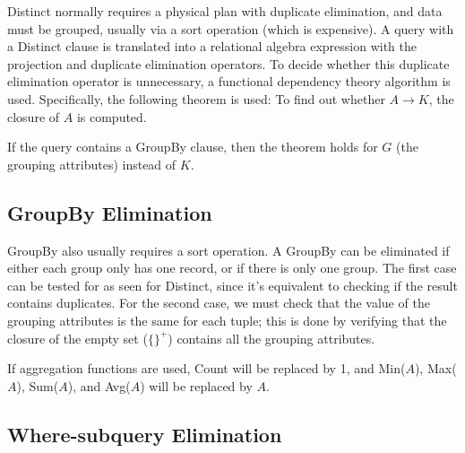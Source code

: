 Distinct normally requires a physical plan with duplicate elimination, and data must be grouped, usually via a sort operation (which is expensive). A query with a Distinct clause is translated into a relational algebra expression with the projection and duplicate elimination operators. To decide whether this duplicate elimination operator is unnecessary, a functional dependency theory algorithm is used. Specifically, the following theorem is used:
To find out whether $A \rightarrow K$, the closure of $A$ is computed.

If the query contains a GroupBy clause, then the theorem holds for $G$ (the grouping attributes) instead of $K$.

\subsection{GroupBy Elimination}

GroupBy also usually requires a sort operation. A GroupBy can be eliminated if either each group only has one record, or if there is only one group. The first case can be tested for as seen for Distinct, since it's equivalent to checking if the result contains duplicates. For the second case, we must check that the value of the grouping attributes is the same for each tuple; this is done by verifying that the closure of the empty set ($\{\}^+$) contains all the grouping attributes. 

If aggregation functions are used, Count will be replaced by 1, and Min($A$), Max($A$), Sum($A$), and Avg($A$) will be replaced by $A$.

\subsection{Where-subquery Elimination}

